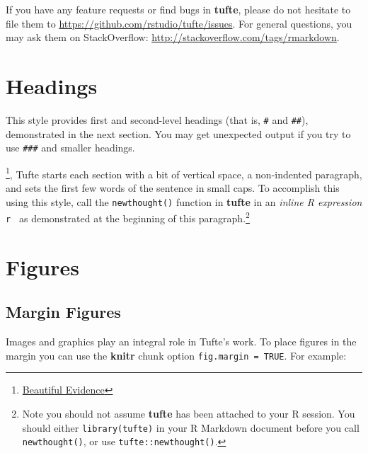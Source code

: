 \documentclass[]{tufte-book}
\newenvironment{Shaded}{}{}
\newcommand{\DataTypeTok}[1]{\textcolor[rgb]{0.56,0.13,0.00}{#1}}
\newcommand{\KeywordTok}[1]{\textcolor[rgb]{0.00,0.44,0.13}{\textbf{#1}}}
\newcommand{\NormalTok}[1]{#1}
\newcommand{\OperatorTok}[1]{\textcolor[rgb]{0.40,0.40,0.40}{#1}}
\newcommand{\StringTok}[1]{\textcolor[rgb]{0.25,0.44,0.63}{#1}}
\begin{document}
If you have any feature requests or find bugs in \textbf{tufte}, please
do not hesitate to file them to
\url{https://github.com/rstudio/tufte/issues}. For general questions,
you may ask them on StackOverflow:
\url{http://stackoverflow.com/tags/rmarkdown}.

\hypertarget{headings}{%
\chapter{Headings}\label{headings}}

This style provides first and second-level headings (that is,
\texttt{\#} and \texttt{\#\#}), demonstrated in the next section. You
may get unexpected output if you try to use \texttt{\#\#\#} and smaller
headings.

\footnote{\href{http://www.edwardtufte.com/tufte/books_be}{Beautiful
  Evidence}}, Tufte starts each section with a bit of vertical space, a
non-indented paragraph, and sets the first few words of the sentence in
small caps. To accomplish this using this style, call the
\texttt{newthought()} function in \textbf{tufte} in an \emph{inline R
expression} \texttt{\textasciigrave{}r\ \textasciigrave{}} as
demonstrated at the beginning of this paragraph.\footnote{Note you
  should not assume \textbf{tufte} has been attached to your R session.
  You should either \texttt{library(tufte)} in your R Markdown document
  before you call \texttt{newthought()}, or use
  \texttt{tufte::newthought()}.}

\hypertarget{figures}{%
\chapter{Figures}\label{figures}}

\hypertarget{margin-figures}{%
\section{Margin Figures}\label{margin-figures}}

Images and graphics play an integral role in Tufte's work. To place
figures in the margin you can use the \textbf{knitr} chunk option
\texttt{fig.margin\ =\ TRUE}. For example:

\begin{Shaded}
\end{Shaded}
\end{document}

